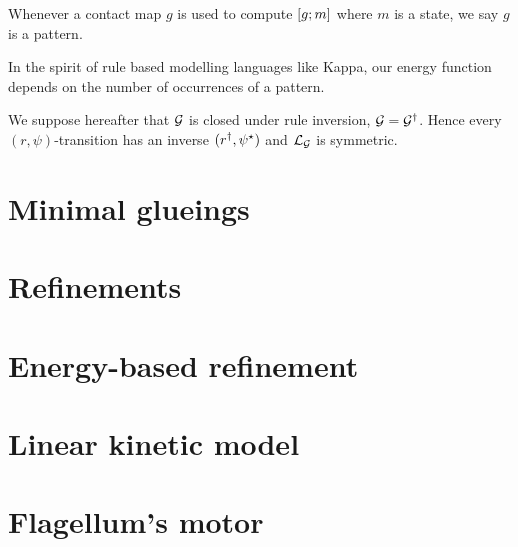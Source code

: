 

Whenever a contact map $g$ is used to compute $\left[g;m\right]$
where $m$ is a state, we say $g$ is a pattern.

In the spirit of rule based modelling languages like Kappa,
our energy function depends on the number of occurrences of a pattern.


We suppose hereafter that $\mathcal{G}$ is closed under
rule inversion, \ie $\mathcal{G} = \mathcal{G}^\dagger$.
Hence every $(r,\psi)$-transition
has an inverse $(r^\dagger,\psi^\star)$
and $\mathcal{L}_{\mathcal{G}}$ is symmetric.


\section{Minimal glueings}
\label{sec:mg}

\section{Refinements} %
\label{sec:gp}
\fi

\section{Energy-based refinement}
\label{sec:energy-gp}

\section{Linear kinetic model}
\label{sec:kinetic-model}

%
%

\section{Flagellum's motor}
\label{sec:alloring}


